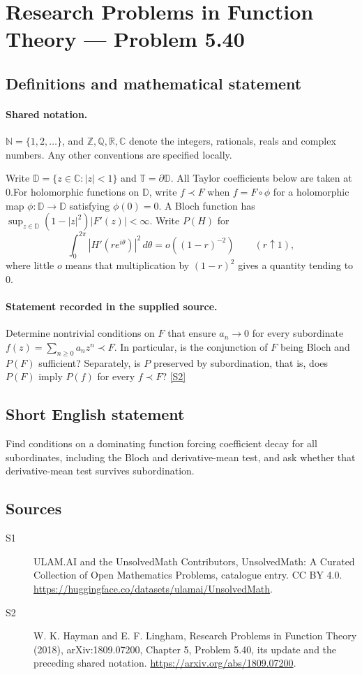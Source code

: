 \documentclass[11pt]{article}
\newcommand{\sref}[2]{\hyperlink{source:#1:#2}{[S#2]}}
\begin{document}
\section{Research Problems in Function Theory — Problem 5.40}\label{statement}

\subsection{Definitions and mathematical statement}

\paragraph{Shared notation.}$\mathbb N=\{1,2,\ldots\}$, and $\mathbb Z,\mathbb Q,\mathbb R,\mathbb C$ denote the integers, rationals, reals and complex numbers. Any other conventions are specified locally.


Write $\mathbb D=\{z\in\mathbb C:|z|<1\}$ and $\mathbb T=\partial\mathbb D$. All Taylor coefficients below are taken at $0$.For holomorphic functions on $\mathbb D$, write $f\prec F$ when $f=F\circ\phi$ for a holomorphic map $\phi:\mathbb D\to\mathbb D$ satisfying $\phi(0)=0$. A Bloch function has $\sup_{z\in\mathbb D}(1-|z|^2)|F'(z)|<\infty$. Write $P(H)$ for
\[\int_0^{2\pi}|H'(re^{i\theta})|^2\,d\theta=o((1-r)^{-2})\qquad(r\uparrow1),\]
where little $o$ means that multiplication by $(1-r)^2$ gives a quantity tending to $0$.
\paragraph{Statement recorded in the supplied source.}
Determine nontrivial conditions on $F$ that ensure $a_n\to0$ for every subordinate $f(z)=\sum_{n\ge0}a_nz^n\prec F$. In particular, is the conjunction of $F$ being Bloch and $P(F)$ sufficient? Separately, is $P$ preserved by subordination, that is, does $P(F)$ imply $P(f)$ for every $f\prec F$? \sref{statement}{2}
\subsection{Short English statement}
Find conditions on a dominating function forcing coefficient decay for all subordinates, including the Bloch and derivative-mean test, and ask whether that derivative-mean test survives subordination.
\subsection{Sources}
\begin{description}
\item[\hypertarget{source:statement:1}{S1}] ULAM.AI and the UnsolvedMath Contributors, UnsolvedMath: A Curated Collection of Open Mathematics Problems, catalogue entry. CC BY 4.0. \url{https://huggingface.co/datasets/ulamai/UnsolvedMath}.
\item[\hypertarget{source:statement:2}{S2}] W. K. Hayman and E. F. Lingham, Research Problems in Function Theory (2018), arXiv:1809.07200, Chapter 5, Problem 5.40, its update and the preceding shared notation. \url{https://arxiv.org/abs/1809.07200}.
\end{description}
\label{end:statement}
\end{document}
